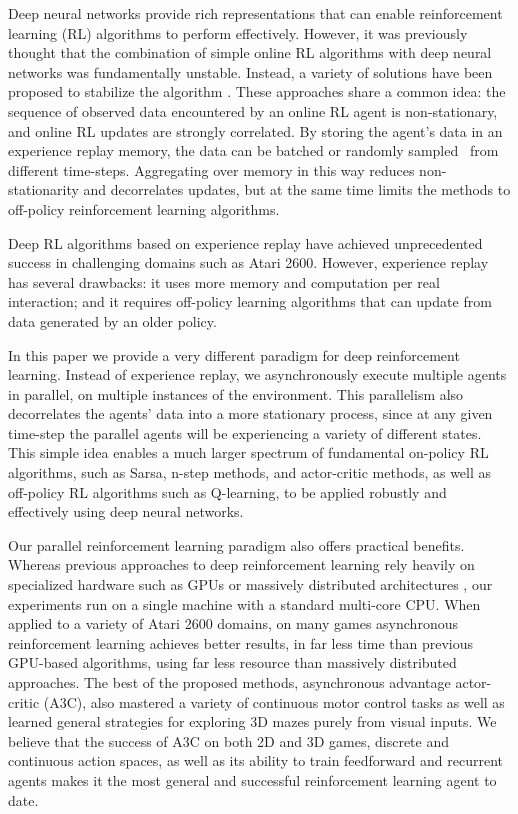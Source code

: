 \documentclass{article} %
\begin{document}
Deep neural networks provide rich representations that can enable reinforcement learning (RL) algorithms to perform effectively.
However, it was previously thought that the combination of simple online RL algorithms with deep neural networks was fundamentally unstable.
Instead, a variety of solutions have been proposed to stabilize the algorithm \citep{riedmiller2005nfq,mnih-atari-2013,mnih-dqn-2015,hado2015doubledqn,schulman2015trust}.
These approaches share a common idea: the sequence of observed data encountered by an online RL agent is non-stationary, and online RL updates are strongly correlated.
By storing the agent's data in an experience replay memory, the data can be batched \citep{riedmiller2005nfq,schulman2015trust} or randomly sampled~\citep{mnih-atari-2013,mnih-dqn-2015,hado2015doubledqn} from different time-steps.
Aggregating over memory in this way reduces non-stationarity and decorrelates updates, but at the same time limits the methods to off-policy reinforcement learning algorithms.

Deep RL algorithms based on experience replay have achieved unprecedented success in challenging domains such as Atari 2600.
However, experience replay has several drawbacks: it uses more memory and computation per real interaction; and it requires off-policy learning algorithms that can update from data generated by an older policy.

In this paper we provide a very different paradigm for deep reinforcement learning.
Instead of experience replay, we asynchronously execute multiple agents in parallel, on multiple instances of the environment.
This parallelism also decorrelates the agents' data into a more stationary process, since at any given time-step the parallel agents will be experiencing a variety of different states.
This simple idea enables a much larger spectrum of fundamental on-policy RL algorithms, such as Sarsa, n-step methods, and actor-critic methods, as well as off-policy RL algorithms such as Q-learning, to be applied robustly and effectively using deep neural networks.

Our parallel reinforcement learning paradigm also offers practical benefits.
%
Whereas previous approaches to deep reinforcement learning rely heavily on specialized hardware such as GPUs \citep{mnih-dqn-2015,hado2015doubledqn,schaul2015prioritized} or massively distributed architectures \citep{nair2015gorila}, our experiments run on a single machine with a standard multi-core CPU.
When applied to a variety of Atari 2600 domains, on many games asynchronous reinforcement learning achieves better results, in far less time than previous GPU-based algorithms, using far less resource than massively distributed approaches.
The best of the proposed methods, asynchronous advantage actor-critic (A3C), also mastered a variety of continuous motor control tasks as well as learned general strategies for exploring 3D mazes purely from visual inputs.
We believe that the success of A3C on both 2D and 3D games, discrete and continuous action spaces, as well as its ability to train feedforward and recurrent agents makes it the most general and successful reinforcement learning agent to date.
\end{document}
